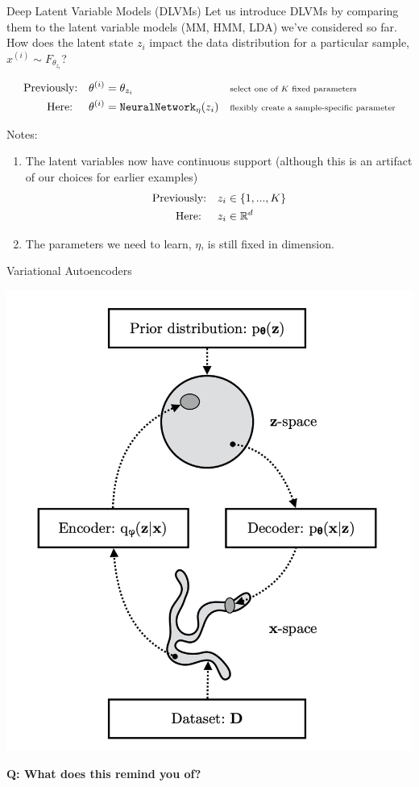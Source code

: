 \documentclass[10pt]{beamer}
\begin{document}
\begin{frame}{Deep Latent Variable Models (DLVMs)}
\footnotesize 
Let us introduce DLVMs by comparing them to the latent variable models  \tiny (MM, HMM, LDA) \footnotesize we've considered so far. \\
\pause 
\vfill 
How does the latent state $z_i$ impact the data distribution for a particular sample, $x^{(i)} \sim F_{\theta_{z_i}}$? 

\begin{align*}
\text{Previously:} \quad & \theta^{(i)} = \theta_{z_i}&& \text{\scriptsize select one of $K$ fixed parameters} \\
\text{Here: } \quad & \theta^{(i)} =  \texttt{NeuralNetwork}_\eta (z_i) && \text{\scriptsize flexibly create a sample-specific parameter} 
\end{align*}

\pause 

Notes:

\begin{enumerate}
\item The latent variables now have continuous support \tiny (although this is an artifact of our choices for earlier examples) \footnotesize 
	\begin{align*}
	\text{Previously:} \quad & z_i \in \{ {1,...,K} \} \\
	\text{Here: } \quad & z_i \in \mathbb{R}^d
	\end{align*} \pause 
\item The parameters we need to learn, $\eta$, is still fixed in dimension. 
\end{enumerate}
\end{frame}


\begin{frame}{Variational Autoencoders}
\begin{center}
\includegraphics[width=.6\textwidth]{images/vae}
\end{center}

\vfill \tiny
\bf{Q}: What does this remind you of? 
\end{frame}
\end{document}
